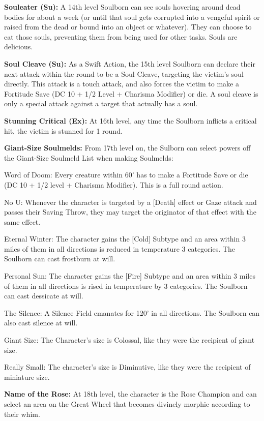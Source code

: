 \textbf{Souleater (Su):} A 14th level Soulborn can see souls hovering around dead bodies for about a week (or until that soul gets corrupted into a vengeful spirit or raised from the dead or bound into an object or whatever). They can choose to eat those souls, preventing them from being used for other tasks. Souls are delicious. 

\textbf{Soul Cleave (Su):} As a Swift Action, the 15th level Soulborn can declare their next attack within the round to be a Soul Cleave, targeting the victim's soul directly. This attack is a touch attack, and also forces the victim to make a Fortitude Save (DC 10 + 1/2 Level + Charisma Modifier) or die. A soul cleave is only a special attack against a target that actually has a soul. 

\textbf{Stunning Critical (Ex):} At 16th level, any time the Soulborn inflicts a critical hit, the victim is stunned for 1 round. 

\textbf{Giant-Size Soulmelds:} From 17th level on, the Sulborn can select powers off the Giant-Size Soulmeld List when making Soulmelds: 
\begin{itemize*}
\item Word of Doom: Every creature within 60' has to make a Fortitude Save or die (DC 10 + 1/2 level + Charisma Modifier). This is a full round action. 
\item No U: Whenever the character is targeted by a [Death] effect or Gaze attack and passes their Saving Throw, they may target the originator of that effect with the same effect. 
\item Eternal Winter: The character gains the [Cold] Subtype and an area within 3 miles of them in all directions is reduced in temperature 3 categories. The Soulborn can cast frostburn at will. 
\item Personal Sun: The character gains the [Fire] Subtype and an area within 3 miles of them in all directions is rised in temperature by 3 categories. The Soulborn can cast dessicate at will. 
\item The Silence: A Silence Field emanates for 120' in all directions. The Soulborn can also cast silence at will. 
\item Giant Size: The Character's size is Colossal, like they were the recipient of giant size. 
\item Really Small: The character's size is Diminutive, like they were the recipient of miniature size. 
\end{itemize*}

\textbf{Name of the Rose:} At 18th level, the character is the Rose Champion and can select an area on the Great Wheel that becomes divinely morphic according to their whim.

